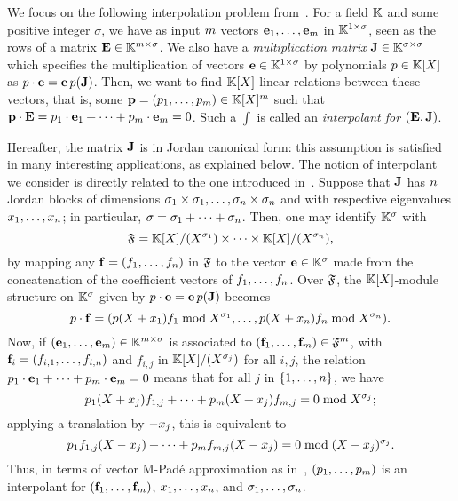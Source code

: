 \documentclass[preprint]{sig-alternate-05-2015}
\begin{document}
We focus on the following interpolation problem
from~\cite{BarBul92,BecLab00}. For a field $\mathbb{K}$ and some positive integer
$\sigma$, we have as input $m$ vectors $\row{e}_1,\ldots,\row{e}_\rdim$ in
$\mathbb{K}^{1\times \sigma}$, seen as the rows of a matrix $\evMat \in
\matSpace[\rdim][\order]$. We also have a \emph{multiplication matrix} $\mulmat
\in \matSpace[\order]$ which specifies the multiplication of vectors $\row{e}
\in \matSpace[1][\order]$ by polynomials $p \in \mathbb{K}[X]$ as $p \mul \row{e} =
\row{e}\, p(\mulmat)$. Then, we want to find $\mathbb{K}[X]$-linear relations
between these vectors, that is, some $\int = (p_1,\ldots,p_\rdim) \in
\polRing^\rdim$ such that $\int \mul \evMat = p_1 \mul \row{e}_1 + \cdots +
p_\rdim \mul \row{e}_\rdim = 0$. Such a $\int$ is called an \emph{interpolant
for $(\evMat,\mulmat)$}.

Hereafter, the matrix $\mulmat$ is in Jordan canonical form: this assumption is
satisfied in many interesting applications, as explained below. The notion of
interpolant we consider is directly related to the one introduced
in~\cite{BarBul92,BecLab00}. Suppose that $\mulmat$ has $n$ Jordan blocks
of dimensions $\sigma_1\times\sigma_1, \ldots, \sigma_n\times\sigma_n$ and
with respective eigenvalues $x_1, \ldots, x_n$; in particular,
$\sigma = \sigma_1 + \cdots + \sigma_n$.  Then, one may identify
$\mathbb{K}^\sigma$ with \vspace{-0.05cm}\[\polSpace=\polRing/(X^{\szbl_1}) \times
\cdots \times \polRing/(X^{\szbl_\nbbl}),\vspace{-0.05cm}\] by mapping any
$\row{f}=(f_1,\dots,f_\nbbl)$ in $\mathfrak{F}$ to the vector $\row{e} \in
\field^\order$ made from the concatenation of the coefficient vectors of
$f_1,\dots,f_n$. Over $\mathfrak{F}$, the $\mathbb{K}[X]$-module structure on
$\mathbb{K}^\sigma$ given by $p \mul \row{e} = \row{e}\, p(\mulmat)$ becomes
\vspace{-0.05cm}\[p \cdot \row{f} = (p(X+\evpt_1) f_1 \bmod X^{\szbl_1},
\dots,p(X+\evpt_\nbbl) f_\nbbl \bmod X^{\szbl_n}).\vspace{-0.05cm}\] Now, if
$(\row{e}_1,\dots,\row{e}_\rdim) \in \field^{\rdim \times \sigma}$ is
associated to $(\row{f}_1,\dots,\row{f}_\rdim) \in \polSpace^\rdim$, with
$\row{f}_i = ({f}_{i,1},\dots,{f}_{i,\nbbl})$ and ${f}_{i,j}$ in
$\mathbb{K}[X]/(X^{\sigma_j})$ for all $i,j$, the relation $p_1 \mul \row{e}_1 +
\cdots + p_\rdim \mul \row{e}_\rdim = 0$ means that for all $j$ in
$\{1,\dots,n\}$, we have \vspace{-0.05cm}\[p_1(X+\evpt_j) f_{1,j} + \cdots
  + p_\rdim(X+\evpt_j) f_{\rdim,j} = 0 \bmod X^{\sigma_j};\vspace{-0.05cm}\]
  applying a translation by $-x_j$, this is equivalent to
\vspace{-0.05cm}
\begin{equation*}
p_1 f_{1,j}(X-x_j) + \cdots + p_m
f_{m,j}(X-x_j) = 0 \bmod (X-x_j)^{\sigma_j}.  
\end{equation*}
\vspace{-0.05cm}
Thus, in terms of vector M-Pad\'e approximation as in~\cite{BarBul92,BecLab00},
$(p_1,\ldots,p_m)$ is an interpolant for
$(\row{f}_1,\ldots,\row{f}_\rdim)$, $x_1, \ldots, x_n$, and
$\sigma_1, \ldots, \sigma_n$.
\end{document}
